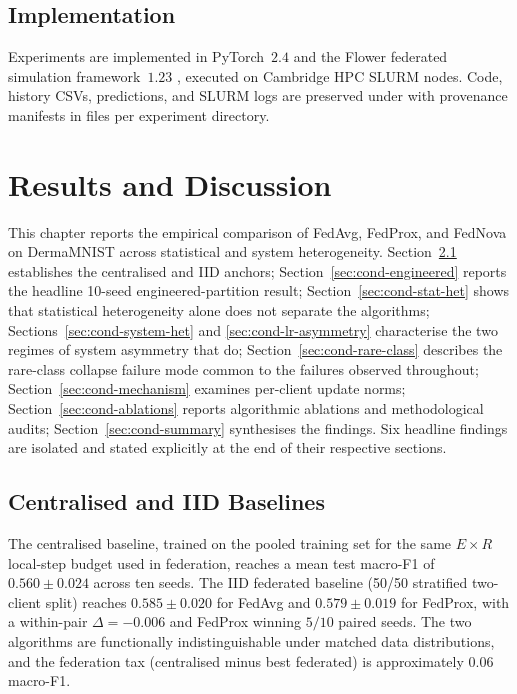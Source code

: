 \documentclass[11pt,a4paper]{report}
\begin{document}
\section{Implementation}
\label{sec:cond-implementation}

Experiments are implemented in PyTorch~$2.4$ and the Flower federated
simulation framework~$1.23$ \citep{beutel2020flower}, executed on Cambridge
HPC SLURM nodes. Code, history CSVs, predictions, and SLURM logs are
preserved under
 with provenance manifests in
 files per experiment directory.

\chapter{Results and Discussion}
\label{ch:results-condensed}

This chapter reports the empirical comparison of FedAvg, FedProx, and FedNova
on DermaMNIST across statistical and system heterogeneity. Section~\ref{sec:cond-baseline}
establishes the centralised and IID anchors; Section~\ref{sec:cond-engineered}
reports the headline 10-seed engineered-partition result;
Section~\ref{sec:cond-stat-het} shows that statistical heterogeneity alone
does not separate the algorithms; Sections~\ref{sec:cond-system-het} and
\ref{sec:cond-lr-asymmetry} characterise the two regimes of system asymmetry
that do; Section~\ref{sec:cond-rare-class} describes the rare-class
collapse failure mode common to the failures observed throughout;
Section~\ref{sec:cond-mechanism} examines per-client update norms;
Section~\ref{sec:cond-ablations} reports algorithmic ablations and
methodological audits; Section~\ref{sec:cond-summary} synthesises the
findings. Six headline findings are isolated and stated explicitly at the
end of their respective sections.

\section{Centralised and IID Baselines}
\label{sec:cond-baseline}

The centralised baseline, trained on the pooled training set for the same
$E \times R$ local-step budget used in federation, reaches a mean test
macro-F1 of $0.560 \pm 0.024$ across ten seeds. The IID federated baseline
(50/50 stratified two-client split) reaches $0.585 \pm 0.020$ for FedAvg and
$0.579 \pm 0.019$ for FedProx, with a within-pair $\Delta = -0.006$ and
FedProx winning $5/10$ paired seeds. The two algorithms are functionally
indistinguishable under matched data distributions, and the federation tax
(centralised minus best federated) is approximately $0.06$ macro-F1.
\end{document}
